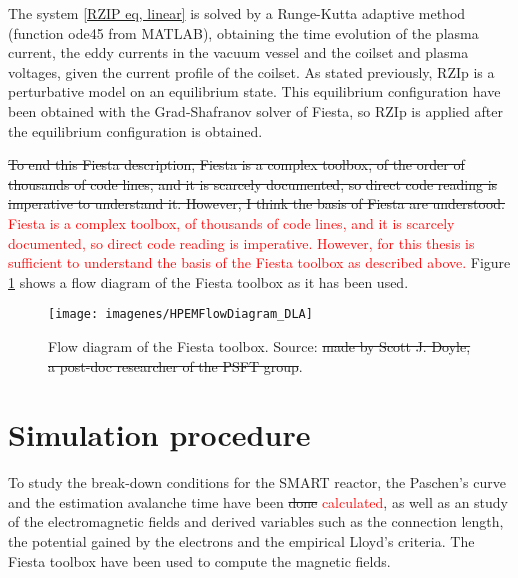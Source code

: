 \documentclass[a4paper,12pt,oneside]{book}
\begin{document}
The system \eqref{RZIP eq, linear} is solved by a Runge-Kutta adaptive method (function ode45 from MATLAB), obtaining the time evolution of the plasma current, the eddy currents in the vacuum vessel and the coilset and plasma voltages, given the current profile of the coilset. As stated previously, RZIp is a perturbative model on an equilibrium state. This equilibrium configuration have been obtained with the Grad-Shafranov solver of Fiesta, so RZIp is applied after the equilibrium configuration is obtained.

\st{To end this Fiesta description, Fiesta is a complex toolbox, of the order of thousands of code lines, and it is scarcely documented, so direct code reading is imperative to understand it. However, I think the basis of Fiesta are understood.} \textcolor{red}{Fiesta is a complex toolbox, of thousands of code lines, and it is scarcely documented, so direct code reading is imperative. However, for this thesis is sufficient to understand the basis of the Fiesta toolbox as described above.} Figure \ref{fig_diagram_Fiesta} shows a flow diagram of the Fiesta toolbox as it has been used.


\begin{figure}[htbp]
\centering
\texttt{[image: imagenes/HPEMFlowDiagram\_DLA]}
\caption{Flow diagram of the Fiesta toolbox. Source: \cite{Scott} \st{made by Scott J. Doyle, a post-doc researcher of the PSFT group}.}
\label{fig_diagram_Fiesta}
\end{figure}


\chapter{Simulation procedure}
\label{chapter_simu}

To study the break-down conditions for the SMART reactor, the Paschen's curve and the estimation avalanche time have been \st{done} \textcolor{red}{calculated}, as well as an study of the electromagnetic fields and derived variables such as the connection length, the potential gained by the electrons and the empirical Lloyd's criteria. The Fiesta toolbox have been used to compute the magnetic fields.
\end{document}
